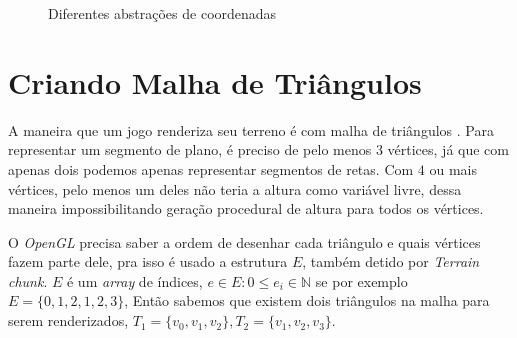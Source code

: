 \begin{figure}[H]
     \centering
     \hspace{0.1cm}
     \caption{Diferentes abstrações de coordenadas}
     \label{fig:coordenadasuahsuahs}
\end{figure}

\section{Criando Malha de Triângulos}
A maneira que um jogo renderiza seu terreno é com malha de triângulos \cite{dachsbacher2006interactive}.%
Para representar um segmento de plano, é preciso de pelo menos $3$ vértices, 
já que com apenas dois podemos apenas representar segmentos de retas. Com $4$ ou mais vértices,
pelo menos um deles não teria a altura como variável livre, dessa maneira impossibilitando geração procedural de altura para todos os vértices.

O \textit{OpenGL} precisa saber a ordem de desenhar cada triângulo e quais vértices fazem parte dele, 
pra isso é usado a estrutura $E$, também detido por \textit{Terrain chunk}. 
$E$ é um \textit{array} de índices, $e \in E: 0 \leq e_{i} \in \mathbb{N}$ se por exemplo $E = \{ 0, 1, 2, 1, 2, 3\}$, Então sabemos
que existem dois triângulos na malha para serem renderizados, $T_{1} = \{ v_{0}, v_{1}, v_{2}\}, T_{2} = \{ v_{1}, v_{2}, v_{3}\}$.

